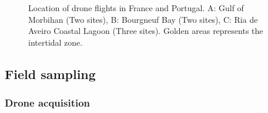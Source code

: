 \documentclass[
  number]{elsarticle}
\begin{document}
\label{cell-fig-map}
\begin{figure}[H]


\caption{\label{fig-map}Location of drone flights in France and
Portugal. A: Gulf of Morbihan (Two sites), B: Bourgneuf Bay (Two sites),
C: Ria de Aveiro Coastal Lagoon (Three sites). Golden areas represents
the intertidal zone.}

\end{figure}%

\subsection{Field sampling}\label{field-sampling}

\subsubsection{Drone acquisition}\label{drone-acquisition}
\end{document}
